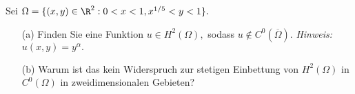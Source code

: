 
\begin{exercise}

  Sei $\Omega = \{(x, y) \in \R^2: 0 < x < 1, x^{1/5} < y < 1\}.$
  \begin{itemize}
      \item[(a)] Finden Sie eine Funktion $u \in H^2(\Omega),$ sodass $u \not\in C^0(\overline{\Omega}).$ \textit{Hinweis:} $u(x, y) = y^\alpha.$
      \item[(b)] Warum ist das kein Widerspruch zur stetigen Einbettung von $H^2(\Omega)$ in $C^0(\Omega)$ in zweidimensionalen Gebieten?
  \end{itemize}

\end{exercise}


